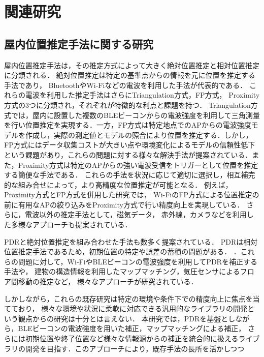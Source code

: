 


\chapter{関連研究}

\section{屋内位置推定手法に関する研究}
屋内位置推定手法は，その推定方式によって大きく絶対位置推定と相対位置推定に分類される．
絶対位置推定は特定の基準点からの情報を元に位置を推定する手法であり，
BluetoothやWi-Fiなどの電波を利用した手法が代表的である．
これらの電波を利用した推定手法はさらにTriangulation方式，FP方式，
Proximity方式の3つに分類され\cite{wireless-lan-summary}，それぞれが特徴的な利点と課題を持つ．
Triangulation方式では，屋内に設置した複数のBLEビーコンからの電波強度を利用して三角測量を行い位置推定を実現する\cite{ble-indoor}\cite{ble-tandem}\cite{triangulation-kalman}．一方，FP方式は特定地点でのAPからの電波強度モデルを作成し，実際の測定値とモデルの照合により位置を推定する．しかし，FP方式にはデータ収集コストが大きい点や環境変化によるモデルの信頼性低下という課題があり，これらの問題に対する様々な解決手法が提案されている\cite{gaussian-mixture-model}\cite{wireless-lan-cost-reduction}\cite{fingerprint-auto-update}\cite{wi-fi-fingerprint-domain}．また，Proximity方式は特定のAPからの強い電波受信をトリガーとして位置を推定する簡便な手法である．
これらの手法を状況に応じて適切に選択し，相互補完的な組み合せによって，より高精度な位置推定が可能となる．
例えば，Proximity方式とFP方式を併用した研究\cite{proximity-fingerprint}では，
Wi-FiのFP方式による位置推定の前に有用なAPの絞り込みをProximity方式で行い精度向上を実現している．
さらに，電波以外の推定手法として，磁気データ\cite{pdr-mag}，
赤外線\cite{infrared}，カメラ\cite{camera}などを利用した多様なアプローチも提案されている．

PDRと絶対位置推定を組み合わせた手法も数多く提案されている．
PDRは相対位置推定手法であるため，初期位置の特定や誤差の蓄積の問題がある．
．これらの問題に対して，Wi-FiやBLEビーコンの電波強度を利用してPDRを補正する手法\cite{pdr-wifi}\cite{pdr-rss-fusion}\cite{pdr-ble}や，
建物の構造情報を利用したマップマッチング\cite{pdr-map}，気圧センサによるフロア間移動の推定\cite{pdr-wifi}\cite{pdr-stable}など，
様々なアプローチが研究されている．

しかしながら，これらの既存研究は特定の環境や条件下での精度向上に焦点を当てており，
様々な環境や状況に柔軟に対応できる汎用的なライブラリの開発という観点からの研究は十分とは言えない．
 本研究では，PDRを基盤としながら，BLEビーコンの電波強度を用いた補正，マップマッチングによる補正，
 さらには初期位置や終了位置など様々な情報源からの補正を統合的に扱えるライブラリの開発を目指す．このアプローチにより，既存手法の長所を活かしつつ


